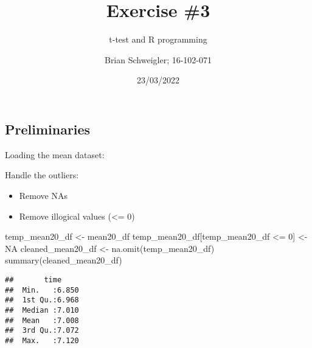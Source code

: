 \documentclass[
]{article}
\title{Exercise \#3}
\subtitle{t-test and R programming}
\author{Brian Schweigler; 16-102-071}
\date{23/03/2022}
\newenvironment{Shaded}{\begin{snugshade}}{\end{snugshade}}
\newcommand{\AttributeTok}[1]{\textcolor[rgb]{0.77,0.63,0.00}{#1}}
\newcommand{\ConstantTok}[1]{\textcolor[rgb]{0.00,0.00,0.00}{#1}}
\newcommand{\DecValTok}[1]{\textcolor[rgb]{0.00,0.00,0.81}{#1}}
\newcommand{\FunctionTok}[1]{\textcolor[rgb]{0.00,0.00,0.00}{#1}}
\newcommand{\NormalTok}[1]{#1}
\newcommand{\OtherTok}[1]{\textcolor[rgb]{0.56,0.35,0.01}{#1}}
\newcommand{\SpecialCharTok}[1]{\textcolor[rgb]{0.00,0.00,0.00}{#1}}
\newcommand{\StringTok}[1]{\textcolor[rgb]{0.31,0.60,0.02}{#1}}
\begin{document}
\maketitle

\hypertarget{preliminaries}{%
\subsection{Preliminaries}\label{preliminaries}}

Loading the mean dataset:

\begin{Shaded}
\end{Shaded}

Handle the outliers:

\begin{itemize}
\item
  Remove NAs
\item
  Remove illogical values (\textless= 0)
\end{itemize}

\begin{Shaded}
\begin{Highlighting}[]
\NormalTok{temp\_mean20\_df }\OtherTok{\textless{}{-}}\NormalTok{ mean20\_df}
\NormalTok{temp\_mean20\_df[temp\_mean20\_df }\SpecialCharTok{\textless{}=} \DecValTok{0}\NormalTok{] }\OtherTok{\textless{}{-}} \ConstantTok{NA}
\NormalTok{cleaned\_mean20\_df }\OtherTok{\textless{}{-}} \FunctionTok{na.omit}\NormalTok{(temp\_mean20\_df)}
\FunctionTok{summary}\NormalTok{(cleaned\_mean20\_df)}
\end{Highlighting}
\end{Shaded}

\begin{verbatim}
##       time      
##  Min.   :6.850  
##  1st Qu.:6.968  
##  Median :7.010  
##  Mean   :7.008  
##  3rd Qu.:7.072  
##  Max.   :7.120
\end{verbatim}

\begin{Shaded}
\end{Shaded}
\end{document}
